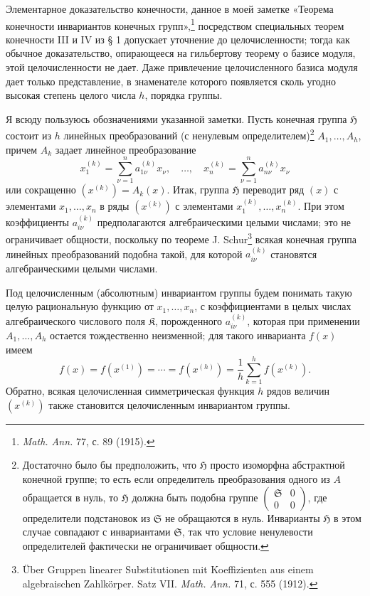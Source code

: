 \documentclass[11pt]{article}
\providecommand{\frH}{\mathfrak H}
\providecommand{\frK}{\mathfrak K}
\providecommand{\frS}{\mathfrak S}
\begin{document}
Элементарное доказательство конечности, данное в моей заметке «Теорема конечности инвариантов конечных групп»,\footnote{\emph{Math. Ann.} 77, с. 89 (1915).} посредством специальных теорем конечности III и IV из § 1 допускает уточнение до целочисленности; тогда как обычное доказательство, опирающееся на гильбертову теорему о базисе модуля, этой целочисленности не дает. Даже привлечение целочисленного базиса модуля дает только представление, в знаменателе которого появляется сколь угодно высокая степень целого числа \(h\), порядка группы.

Я всюду пользуюсь обозначениями указанной заметки. Пусть конечная группа \(\frH\) состоит из \(h\) линейных преобразований (с ненулевым определителем)\footnote{Достаточно было бы предположить, что \(\frH\) просто изоморфна абстрактной конечной группе; то есть если определитель преобразования одного из \(A\) обращается в нуль, то \(\frH\) должна быть подобна группе \(\begin{pmatrix}\frS&0\\0&0\end{pmatrix}\), где определители подстановок из \(\frS\) не обращаются в нуль. Инварианты \(\frH\) в этом случае совпадают с инвариантами \(\frS\), так что условие ненулевости определителей фактически не ограничивает общности.} \(A_1,\ldots,A_h\), причем \(A_k\) задает линейное преобразование
\[
        x_1^{(k)}=\sum_{\nu=1}^{n}a_{1\nu}^{(k)}x_\nu,
        \quad\ldots,\quad
        x_n^{(k)}=\sum_{\nu=1}^{n}a_{n\nu}^{(k)}x_\nu
\]
или сокращенно \((x^{(k)})=A_k(x)\). Итак, группа \(\frH\) переводит ряд \((x)\) с элементами \(x_1,\ldots,x_n\) в ряды \((x^{(k)})\) с элементами \(x_1^{(k)},\ldots,x_n^{(k)}\). При этом коэффициенты \(a_{i\nu}^{(k)}\) предполагаются алгебраическими целыми числами; это не ограничивает общности, поскольку по теореме J. Schur\footnote{Über Gruppen linearer Substitutionen mit Koeffizienten aus einem algebraischen Zahlkörper. Satz VII. \emph{Math. Ann.} 71, с. 555 (1912).} всякая конечная группа линейных преобразований подобна такой, для которой \(a_{i\nu}^{(k)}\) становятся алгебраическими целыми числами.

Под целочисленным (абсолютным) инвариантом группы будем понимать такую целую рациональную функцию от \(x_1,\ldots,x_n\), с коэффициентами в целых числах алгебраического числового поля \(\frK\), порожденного \(a_{i\nu}^{(k)}\), которая при применении \(A_1,\ldots,A_h\) остается тождественно неизменной; для такого инварианта \(f(x)\) имеем
\begin{equation}
        f(x)=f(x^{(1)})=\cdots=f(x^{(h)})
        =\frac1h\sum_{k=1}^{h}f(x^{(k)}).
\end{equation}
Обратно, всякая целочисленная симметрическая функция \(h\) рядов величин \((x^{(k)})\) также становится целочисленным инвариантом группы.
\end{document}
